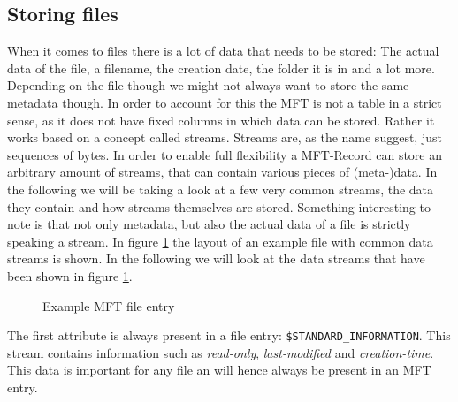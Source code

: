 \subsection{Storing files}
When it comes to files there is a lot of data that needs to be stored: The actual data of the file, a filename, the creation date, the folder it is in and a lot more. Depending on the file though we might not always want to store the same metadata though. In order to account for this the MFT is not a table in a strict sense, as it does not have fixed columns in which data can be stored. Rather it works based on a concept called streams. Streams are, as the name suggest, just sequences of bytes. In order to enable full flexibility a MFT-Record can store an arbitrary amount of streams, that can contain various pieces of (meta-)data. In the following we will be taking a look at a few very common streams, the data they contain and how streams themselves are stored. Something interesting to note is that not only metadata, but also the actual data of a file is strictly speaking a stream. In figure \ref{fig:mft_entry} the layout of an example file with common data streams is shown. In the following we will look at the data streams that have been shown in figure \ref{fig:mft_entry}.
\begin{figure}[H]
	\centering
	\caption{Example MFT file entry\label{fig:mft_entry}}
\end{figure}
The first attribute is always present in a file entry: \texttt{\$STANDARD\_INFORMATION}. This stream contains information such as \textit{read-only}, \textit{last-modified} and \textit{creation-time}. This data is important for any file an will hence always be present in an MFT entry.\cite{RUSSINOVICH_ET_AL:2012:WI}\\
